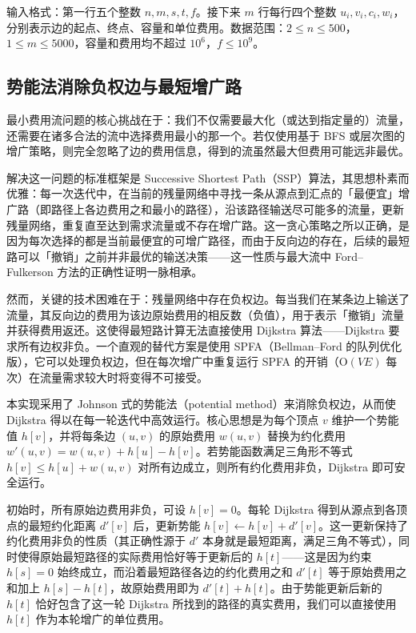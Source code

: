\documentclass[12pt, a4paper]{academics}
\begin{document}
输入格式：第一行五个整数 $n, m, s, t, f$。接下来 $m$ 行每行四个整数 $u_i, v_i, c_i, w_i$，分别表示边的起点、终点、容量和单位费用。数据范围：$2 \le n \le 500$，$1 \le m \le 5000$，容量和费用均不超过 $10^6$，$f \le 10^9$。


\subsection{势能法消除负权边与最短增广路}

最小费用流问题的核心挑战在于：我们不仅需要最大化（或达到指定量的）流量，还需要在诸多合法的流中选择费用最小的那一个。若仅使用基于 BFS 或层次图的增广策略，则完全忽略了边的费用信息，得到的流虽然最大但费用可能远非最优。

解决这一问题的标准框架是 Successive Shortest Path（SSP）算法，其思想朴素而优雅：每一次迭代中，在当前的残量网络中寻找一条从源点到汇点的「最便宜」增广路（即路径上各边费用之和最小的路径），沿该路径输送尽可能多的流量，更新残量网络，重复直至达到需求流量或不存在增广路。这一贪心策略之所以正确，是因为每次选择的都是当前最便宜的可增广路径，而由于反向边的存在，后续的最短路可以「撤销」之前并非最优的输送决策——这一性质与最大流中 Ford--Fulkerson 方法的正确性证明一脉相承。

然而，关键的技术困难在于：残量网络中存在负权边。每当我们在某条边上输送了流量，其反向边的费用为该边原始费用的相反数（负值），用于表示「撤销」流量并获得费用返还。这使得最短路计算无法直接使用 Dijkstra 算法——Dijkstra 要求所有边权非负。一个直观的替代方案是使用 SPFA（Bellman--Ford 的队列优化版），它可以处理负权边，但在每次增广中重复运行 SPFA 的开销（$\mathrm{O}(VE)$ 每次）在流量需求较大时将变得不可接受。

本实现采用了 Johnson 式的势能法（potential method）来消除负权边，从而使 Dijkstra 得以在每一轮迭代中高效运行。核心思想是为每个顶点 $v$ 维护一个势能值 $h[v]$，并将每条边 $(u, v)$ 的原始费用 $w(u, v)$ 替换为约化费用 $w'(u, v) = w(u, v) + h[u] - h[v]$。若势能函数满足三角形不等式 $h[v] \le h[u] + w(u, v)$ 对所有边成立，则所有约化费用非负，Dijkstra 即可安全运行。

初始时，所有原始边费用非负，可设 $h[v] = 0$。每轮 Dijkstra 得到从源点到各顶点的最短约化距离 $d'[v]$ 后，更新势能 $h[v] \leftarrow h[v] + d'[v]$。这一更新保持了约化费用非负的性质（其正确性源于 $d'$ 本身就是最短距离，满足三角不等式），同时使得原始最短路径的实际费用恰好等于更新后的 $h[t]$——这是因为约束 $h[s] = 0$ 始终成立，而沿着最短路径各边的约化费用之和 $d'[t]$ 等于原始费用之和加上 $h[s] - h[t]$，故原始费用即为 $d'[t] + h[t]$。由于势能更新后新的 $h[t]$ 恰好包含了这一轮 Dijkstra 所找到的路径的真实费用，我们可以直接使用 $h[t]$ 作为本轮增广的单位费用。
\end{document}
